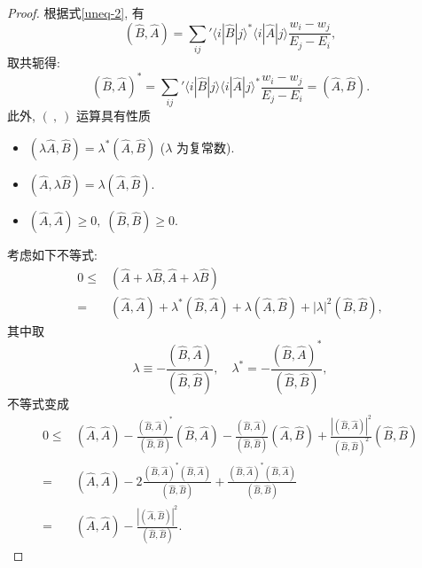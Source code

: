\begin{proof}
    根据式\eqref{uneq-2}, 有
    \begin{equation}
        \left( \hat{B},\hat{A} \right)=\sum_{ij}^{ }{}'\langle i|\hat{B}|j \rangle^*\langle i|\hat{A}|j \rangle\frac{w_i-w_j}{E_j-E_i},
    \end{equation}
    取共轭得:
    \begin{equation}
        \left( \hat{B},\hat{A} \right)^*=\sum_{ij}^{ }{}'\langle i|\hat{B}|j \rangle\langle i|\hat{A}|j \rangle^*\frac{w_i-w_j}{E_j-E_i}=\left( \hat{A},\hat{B} \right).
    \end{equation}
    此外, $(~,~)$ 运算具有性质
    \begin{itemize}
        \item $\left(\lambda\hat{A},\hat{B}\right)=\lambda^*\left( \hat{A},\hat{B} \right)$ ($\lambda$ 为复常数).
        \item $\left( \hat{A},\lambda\hat{B} \right)=\lambda\left( \hat{A},\hat{B} \right)$.
        \item $\left(\hat{A},\hat{A}\right)\ge 0,\; \left( \hat{B},\hat{B} \right)\ge 0$.
    \end{itemize}
    考虑如下不等式:
      \begin{align}
            0\le &\left( \hat{A}+\lambda \hat{B},\hat{A}+\lambda\hat{B} \right)\nonumber\\
            =&\left( \hat{A},\hat{A} \right)+\lambda^*\left( \hat{B},\hat{A} \right)+\lambda\left(\hat{A},\hat{B}\right)+|\lambda|^2\left( \hat{B},\hat{B} \right),
        \end{align}
    其中取 
    \begin{equation}
        \lambda\equiv -\frac{(\hat{B},\hat{A})}{(\hat{B},\hat{B})},\quad \lambda^*=-\frac{(\hat{B},\hat{A})^*}{(\hat{B},\hat{B})},
    \end{equation}
    不等式变成
    \begin{align}
            0\le &\left( \hat{A},\hat{A} \right)-\frac{(\hat{B},\hat{A})^*}{(\hat{B},\hat{B})}\left( \hat{B},\hat{A} \right)-\frac{(\hat{B},\hat{A})}{(\hat{B},\hat{B})}\left( \hat{A},\hat{B} \right)+\frac{\left| (\hat{B},\hat{A}) \right|^2}{(\hat{B},\hat{B})^2}\left( \hat{B},\hat{B} \right)\nonumber\\
            =&\left( \hat{A},\hat{A} \right)-2\frac{(\hat{B},\hat{A})^*(\hat{B},\hat{A})}{(\hat{B},\hat{B})}+\frac{(\hat{B},\hat{A})^*(\hat{B},\hat{A})}{(\hat{B},\hat{B})}\nonumber\\
            =&\left( \hat{A},\hat{A} \right)-\frac{\left| (\hat{A},\hat{B}) \right|^2}{(\hat{B},\hat{B})}.
        \end{align}
\end{proof}
